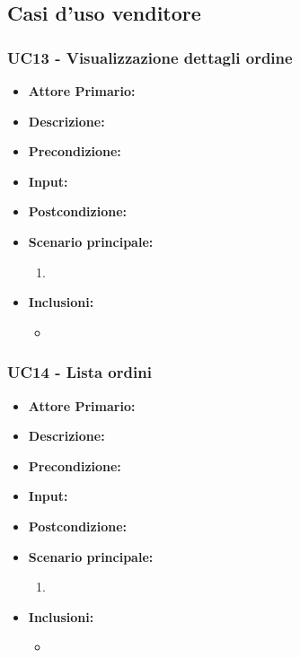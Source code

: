 \subsection{Casi d'uso venditore}
\subsubsection{UC13 - Visualizzazione dettagli ordine}
\begin{itemize}
    \item \textbf{Attore Primario:} 
    \item \textbf{Descrizione:}
    \item \textbf{Precondizione:}
    \item \textbf{Input:}
    \item \textbf{Postcondizione:}
    \item \textbf{Scenario principale:}
    \begin{enumerate}
        \item 
    \end{enumerate}
    \item \textbf{Inclusioni:}
    \begin{itemize}
        \item
    \end{itemize}
\end{itemize}
\subsubsection{UC14 - Lista ordini}
\begin{itemize}
    \item \textbf{Attore Primario:} 
    \item \textbf{Descrizione:}
    \item \textbf{Precondizione:}
    \item \textbf{Input:}
    \item \textbf{Postcondizione:}
    \item \textbf{Scenario principale:}
    \begin{enumerate}
        \item 
    \end{enumerate}
    \item \textbf{Inclusioni:}
    \begin{itemize}
        \item
    \end{itemize}
\end{itemize}
